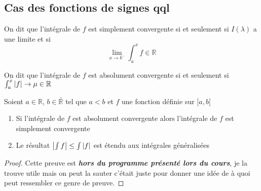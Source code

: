 \documentclass[11pt,colorlinks]{book}
\theoremstyle{mytheoremstyle}
\theoremstyle{mytheoremstyle}
\theoremstyle{mytheoremstyle}
\theoremstyle{mytheoremstyle}
\theoremstyle{mytheoremstyle}
\theoremstyle{mytheoremstyle}
\theoremstyle{mytheoremstyle}
\theoremstyle{mytheoremstyle}
\theoremstyle{myproblemstyle}
\def\mbb#1{\mathbb{#1}}
\def\bR{\mbb{R}}
\begin{document}
  \subsection{Cas des fonctions de signes qql}
  \begin{definition}
    On dit que l'intégrale de $f$ est simplement convergente si et seulement si $I(\lambda)$ a une limite et si
    \begin{equation*}
      \lim_{x \to b^{-}} \int_a^x f \in \bR
    \end{equation*}
  \end{definition}
  \begin{definition}
    On dit que l'intégrale de $f$ est absolument convergente si et seulement si $\int_a^x \abs{f} \to \mu \in \bR$ 
  \end{definition}
  \begin{theorem}[Comparaison]
    Soient $a \in \bR$, $b \in \bar{\bR}$ tel que $a < b$ et $f$ une fonction définie sur $[a,b[$
    \begin{enumerate}
      \item Si l'intégrale de $f$ est absolument convergente alors l'intégrale de $f$ est simplement convergente
      \item Le résultat $\abs{\int f} \leq \int \abs{f}$ est étendu aux intégrales généralisées
    \end{enumerate}
    \begin{proof}
      Cette preuve est \textit{\textbf{hors du programme présenté lors du cours}}, je la trouve utile mais on peut la sauter c'était juste pour donner une idée 
      de à quoi peut ressembler ce genre de preuve.\newline 



\end{proof}
\end{theorem}
\end{document}
